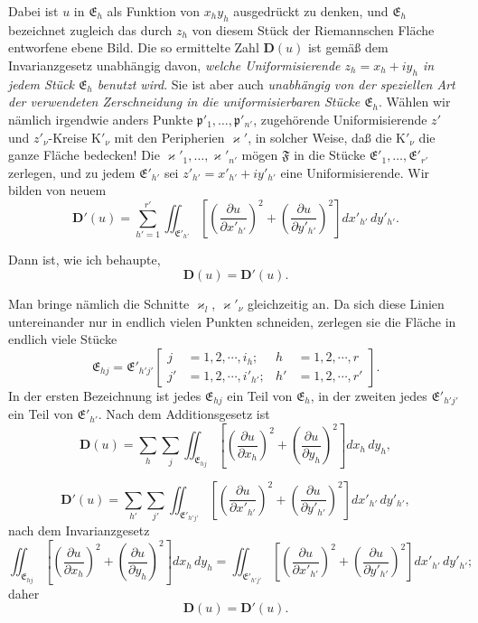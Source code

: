 \documentclass{article}
\begin{document}
Dabei ist $u$ in $\mathfrak{E}_h$ als Funktion von $x_h y_h$ ausgedrückt zu denken, und $\mathfrak{E}_h$ bezeichnet zugleich das durch $z_h$ von diesem Stück der Riemannschen Fläche entworfene ebene Bild. Die so ermittelte Zahl $\mathbf{D}(u)$ ist gemäß dem Invarianzgesetz unabhängig davon, \emph{welche Uniformisierende $z_h = x_h + i y_h$ in jedem Stück $\mathfrak{E}_h$ benutzt wird}. Sie ist aber auch \emph{unabhängig von der speziellen Art der verwendeten Zerschneidung in die uniformisierbaren Stücke $\mathfrak{E}_h$}. Wählen wir nämlich irgendwie anders Punkte $\mathfrak{p}'_1, \dots, \mathfrak{p}'_{n'}$, zugehörende Uniformisierende $z'$ und $z'_\nu$-Kreise $\mathrm{K}'_\nu$ mit den Peripherien $\varkappa'$, in solcher Weise, daß die $\mathrm{K}'_\nu$ die ganze Fläche bedecken! Die $\varkappa'_1, \dots, \varkappa'_{n'}$ mögen $\mathfrak{F}$ in die Stücke $\mathfrak{E}'_1, \dots, \mathfrak{E}'_{r'}$ zerlegen, und zu jedem $\mathfrak{E}'_{h'}$ sei $z'_{h'} = x'_{h'} + i y'_{h'}$ eine Uniformisierende. Wir bilden von neuem
\[ \mathbf{D}'(u) = \sum_{h'=1}^{r'} \iint_{\mathfrak{E}'_{h'}} \left[ \left(\frac{\partial u}{\partial x'_{h'}}\right)^2 + \left(\frac{\partial u}{\partial y'_{h'}}\right)^2 \right] dx'_{h'}\,dy'_{h'}. \]

Dann ist, wie ich behaupte,
\[ \mathbf{D}(u) = \mathbf{D}'(u). \]

Man bringe nämlich die Schnitte $\varkappa_l$, $\varkappa'_\nu$ gleichzeitig an. Da sich diese Linien untereinander nur in endlich vielen Punkten schneiden, zerlegen sie die Fläche in endlich viele Stücke
\[ \mathfrak{E}_{hj} = \mathfrak{E}'_{h'j'} \left[ \begin{aligned} j &= 1, 2, \cdots, i_h; & h &= 1, 2, \cdots, r \\ j' &= 1, 2, \cdots, i'_{h'}; & h' &= 1, 2, \cdots, r' \end{aligned} \right]. \]
In der ersten Bezeichnung ist jedes $\mathfrak{E}_{hj}$ ein Teil von $\mathfrak{E}_h$, in der zweiten jedes $\mathfrak{E}'_{h'j'}$ ein Teil von $\mathfrak{E}'_{h'}$. Nach dem Additionsgesetz ist
\[ \mathbf{D}(u) = \sum_h \sum_j \iint_{\mathfrak{E}_{hj}} \left[ \left(\frac{\partial u}{\partial x_h}\right)^2 + \left(\frac{\partial u}{\partial y_h}\right)^2 \right] dx_h\,dy_h, \]

\[ \mathbf{D}'(u) = \sum_{h'} \sum_{j'} \iint_{\mathfrak{E}'_{h'j'}} \left[ \left(\frac{\partial u}{\partial x'_{h'}}\right)^2 + \left(\frac{\partial u}{\partial y'_{h'}}\right)^2 \right] dx'_{h'}\,dy'_{h'}, \]
nach dem Invarianzgesetz
\[ \iint_{\mathfrak{E}_{hj}} \left[ \left(\frac{\partial u}{\partial x_h}\right)^2 + \left(\frac{\partial u}{\partial y_h}\right)^2 \right] dx_h\,dy_h = \iint_{\mathfrak{E}'_{h'j'}} \left[ \left(\frac{\partial u}{\partial x'_{h'}}\right)^2 + \left(\frac{\partial u}{\partial y'_{h'}}\right)^2 \right] dx'_{h'}\,dy'_{h'}; \]
daher
\[ \mathbf{D}(u) = \mathbf{D}'(u). \]
\end{document}
